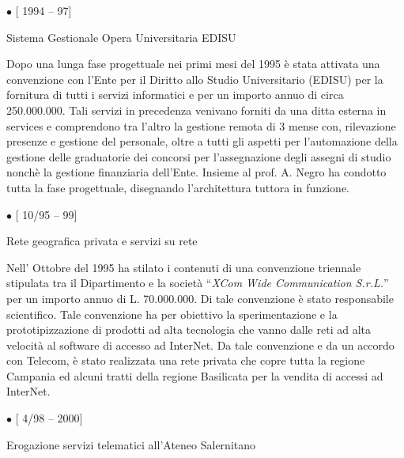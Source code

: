 \documentclass[11pt]{article}
\newlength{\posii}
\newlength{\posiibox}
\newlength{\boxsize}
\begin{document}
\begin{description}
\item \parbox[t]{\posiibox} 
{\bf \raggedright $ \bullet $ [ 1994 -- 97] \par
\medskip
Sistema Gestionale Opera Universitaria EDISU}
\hfill \parbox[t]{\boxsize} {

Dopo una lunga fase progettuale nei primi mesi del 1995 \`e stata
attivata una convenzione con l'Ente per il Diritto allo Studio
Universitario (EDISU) per la fornitura di tutti i servizi
informatici e per un importo annuo di circa 250.000.000. Tali
servizi in precedenza venivano forniti da una ditta esterna in
services e comprendono tra l'altro la gestione remota di 3 mense
con, rilevazione presenze e gestione del personale, oltre a tutti
gli aspetti per l'automazione della gestione delle graduatorie dei
concorsi per l'assegnazione degli assegni di studio nonch\`e la
gestione finanziaria dell'Ente. Insieme al prof. A. Negro ha
condotto tutta la fase progettuale, disegnando l'architettura
tuttora in funzione.}

\item \parbox[t]{\posiibox} 
{\bf \raggedright $ \bullet $ [ 10/95 -- 99] \par
\medskip
Rete geografica privata e servizi su rete}
\hfill \parbox[t]{\boxsize} {

Nell' Ottobre del 1995 ha stilato i contenuti di una convenzione
triennale stipulata tra il Dipartimento e la societ\`a ``{\sl XCom
Wide Communication S.r.L.}'' per un importo annuo di L.
70.000.000. Di tale convenzione \`e stato responsabile
scientifico.  Tale convenzione ha per obiettivo la sperimentazione
e la prototipizzazione di prodotti ad alta tecnologia che vanno
dalle reti ad alta velocit\`a al software di accesso ad InterNet.
Da tale convenzione e da un accordo con Telecom, \`e stato
realizzata una rete privata che copre tutta la regione Campania ed
alcuni tratti della regione Basilicata per la vendita di accessi
ad InterNet.}

\item \parbox[t]{\posiibox} 
{\bf \raggedright $ \bullet $ [ 4/98 -- 2000] \par
\medskip
Erogazione servizi telematici all'Ateneo Salernitano}
\hfill \parbox[t]{\boxsize} {

}
\end{description}
\end{document}
